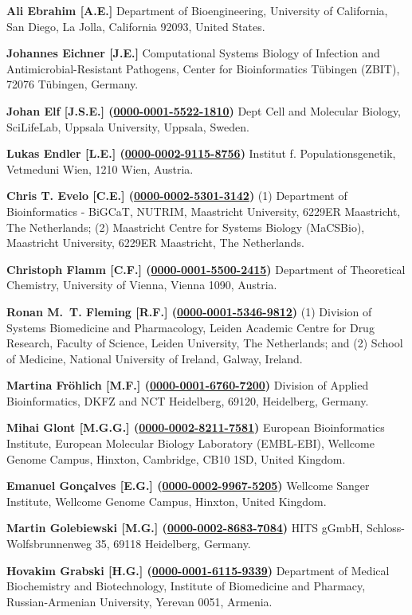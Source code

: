 \documentclass{sbml-paper}
\newcommand{\orcid}[1]{\href{https://orcid.org/#1}{#1}}
\begin{document}
\textbf{Ali Ebrahim [A.E.]} Department of Bioengineering, University of California, San Diego, La Jolla, California 92093, United States.

\textbf{Johannes Eichner [J.E.]} Computational Systems Biology of Infection and Antimicrobial-Resistant Pathogens, Center for Bioinformatics T\"{u}bingen (ZBIT), 72076 T\"{u}bingen, Germany.

\textbf{Johan Elf [J.S.E.] (\orcid{0000-0001-5522-1810})} Dept Cell and Molecular Biology, SciLifeLab, Uppsala University, Uppsala, Sweden.

\textbf{Lukas Endler [L.E.] (\orcid{0000-0002-9115-8756})} Institut f. Populationsgenetik, Vetmeduni  Wien, 1210 Wien, Austria.

\textbf{Chris T. Evelo [C.E.] (\orcid{0000-0002-5301-3142})} (1) Department of Bioinformatics - BiGCaT, NUTRIM, Maastricht University, 6229ER Maastricht, The Netherlands; (2) Maastricht Centre for Systems Biology (MaCSBio), Maastricht University, 6229ER Maastricht, The Netherlands.

\textbf{Christoph Flamm [C.F.] (\orcid{0000-0001-5500-2415})} Department of Theoretical Chemistry, University of Vienna, Vienna 1090, Austria.

\textbf{Ronan M.~T. Fleming [R.F.] (\orcid{0000-0001-5346-9812})} (1) Division of Systems Biomedicine and Pharmacology, Leiden Academic Centre for Drug Research, Faculty of Science, Leiden University, The Netherlands; and (2) School of Medicine, National University of Ireland, Galway, Ireland.

\textbf{Martina Fr\"{o}hlich [M.F.] (\orcid{0000-0001-6760-7200})} Division of Applied Bioinformatics, DKFZ and NCT Heidelberg, 69120, Heidelberg, Germany.

\textbf{Mihai Glont [M.G.G.] (\orcid{0000-0002-8211-7581})} European Bioinformatics Institute, European Molecular Biology Laboratory (EMBL-EBI), Wellcome Genome Campus, Hinxton, Cambridge, CB10 1SD, United Kingdom.

\textbf{Emanuel Gon\c{c}alves [E.G.] (\orcid{0000-0002-9967-5205})} Wellcome Sanger Institute, Wellcome Genome Campus, Hinxton, United Kingdom.

\textbf{Martin Golebiewski [M.G.] (\orcid{0000-0002-8683-7084})} HITS gGmbH, Schloss-Wolfsbrunnenweg 35, 69118 Heidelberg, Germany.

\textbf{Hovakim Grabski [H.G.] (\orcid{0000-0001-6115-9339})} Department of Medical Biochemistry and Biotechnology, Institute of Biomedicine and Pharmacy, Russian-Armenian University, Yerevan 0051, Armenia.
\end{document}

